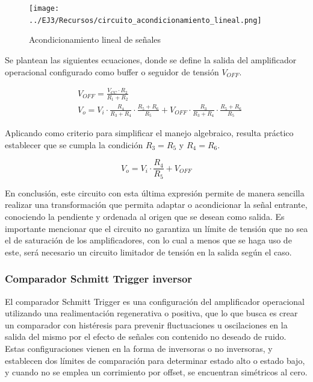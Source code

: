 \begin{figure}[H]
    \centering
    \texttt{[image: ../EJ3/Recursos/circuito\_acondicionamiento\_lineal.png]}
    \caption{Acondicionamiento lineal de se\~nales}
    \label{fig:circuito_acondicionamiento_lineal}
\end{figure}

Se plantean las siguientes ecuaciones, donde se define la salida del amplificador operacional configurado como buffer o seguidor de tensi\'on $V_{OFF}$.

\begin{align*}
    & V_{OFF} = \frac{V_{CC} \cdot R_2}{R_1 + R_2} \\
    & V_o = V_i \cdot \frac{R_4}{R_3 + R_4} \cdot \frac{R_5 + R_6}{R_5}
    + V_{OFF} \cdot \frac{R_3}{R_3 + R_4} \cdot \frac{R_5 + R_6}{R_5}
\end{align*}

Aplicando como criterio para simplificar el manejo algebraico, resulta pr\'actico establecer que se cumpla la condici\'on
$R_3 = R_5$ y $R_4 = R_6$.

\begin{equation}
    V_o = V_i \cdot \frac{R_4}{R_5} + V_{OFF}
\end{equation}

En conclusi\'on, este circuito con esta \'ultima expresi\'on permite de manera sencilla realizar una transformaci\'on que permita adaptar o acondicionar
la se\~nal entrante, conociendo la pendiente y ordenada al origen que se desean como salida. Es importante mencionar que el circuito no garantiza un l\'imite de tensi\'on 
que no sea el de saturaci\'on de los amplificadores, con lo cual a menos que se haga uso de este, ser\'a necesario un circuito limitador de tensi\'on en la salida seg\'un el caso.

\subsubsection{Comparador Schmitt Trigger inversor}
El comparador Schmitt Trigger es una configuraci\'on del amplificador operacional utilizando una realimentaci\'on regenerativa o positiva,
que lo que busca es crear un comparador con hist\'eresis para prevenir fluctuaciones u oscilaciones en la salida del mismo por el efecto de se\~nales
con contenido no deseado de ruido. Estas configuraciones vienen en la forma de inversoras o no inversoras, y establecen dos l\'imites de comparaci\'on
para determinar estado alto o estado bajo, y cuando no se emplea un corrimiento por offset, se encuentran sim\'etricos al cero.

